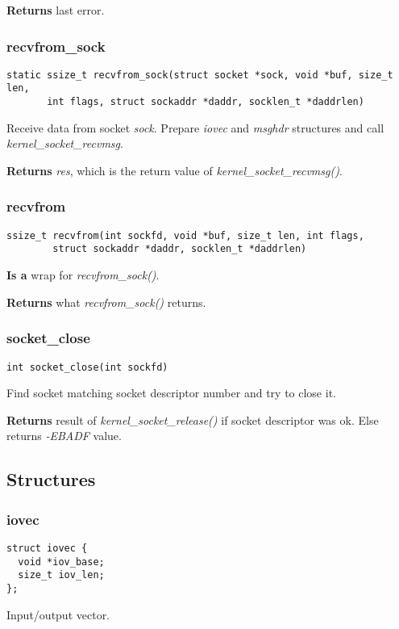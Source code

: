 \documentclass[12pt,a4paper]{article}
\begin{document}
{\bf Returns} last error.

\subsubsection{recvfrom\_sock}
\label{sec:socket_c_recvfrom_sock}
\begin{verbatim}
static ssize_t recvfrom_sock(struct socket *sock, void *buf, size_t len,
       int flags, struct sockaddr *daddr, socklen_t *daddrlen)
\end{verbatim}
Receive data from socket {\it sock}. Prepare {\it iovec} and {\it msghdr}
structures and call {\it kernel\_socket\_recvmsg}.

{\bf Returns } {\it res}, which is the return value of
{\it kernel\_socket\_recvmsg()}.

\subsubsection{recvfrom}
\label{sec:socket_c_recvfrom}
\begin{verbatim}
ssize_t recvfrom(int sockfd, void *buf, size_t len, int flags,
        struct sockaddr *daddr, socklen_t *daddrlen)
\end{verbatim}
{\bf Is a} wrap for {\it recvfrom\_sock()}.

{\bf Returns} what {\it recvfrom\_sock()} returns.

\subsubsection{socket\_close}
\label{sec:socket_c_socket_close}
\begin{verbatim}
int socket_close(int sockfd)
\end{verbatim}
Find socket matching socket descriptor number and try to close it.

{\bf Returns} result of {\it kernel\_socket\_release()} if socket descriptor
was ok. Else returns {\it -EBADF} value.

\subsection{Structures}
\subsubsection{iovec}
\begin{verbatim}
struct iovec {
  void *iov_base;
  size_t iov_len;
};
\end{verbatim}
Input/output vector.
\end{document}
